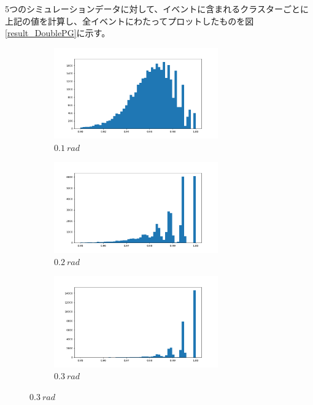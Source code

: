 5つのシミュレーションデータに対して、イベントに含まれるクラスターごとに上記の値を計算し、全イベントにわたってプロットしたものを図\ref{result_DoublePG}に示す。

\begin{figure}[H]
	\begin{subfigure}{.5\textwidth}
		\begin{center}
 		 	\includegraphics[width=200pt]{./Figure/DLAnalysis/rate_pred_1.png}%
  			\caption{$\SI{0.1}{rad}$}
  			\label{fig:sfig1}
 		\end{center}
	\end{subfigure}
	\begin{subfigure}{.5\textwidth}
		\begin{center}
			\includegraphics[width=200pt]{./Figure/DLAnalysis/rate_pred_2.png}%
			\caption{$\SI{0.2}{rad}$}
			\label{fig:sfig2}
		\end{center}
	\end{subfigure}
		\begin{subfigure}{.5\textwidth}
		\begin{center}
			\includegraphics[width=200pt]{./Figure/DLAnalysis/rate_pred_3.png}%
			\caption{$\SI{0.3}{rad}$}
			\label{fig:sfig2}

\end{center}
\end{subfigure}
\end{figure}
